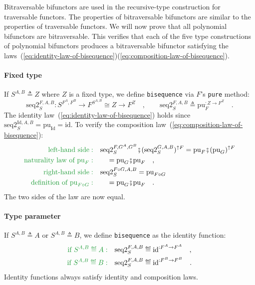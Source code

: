 Bitraversable bifunctors are used in the recursive-type construction
for traversable functors. The properties of bitraversable bifunctors
are similar to the properties of traversable functors. We will now
prove that all polynomial bifunctors are bitraversable. This verifies
that each of the five type constructions of polynomial bifunctors
produces a bitraversable bifunctor satisfying the laws~(\ref{eq:identity-law-of-bisequence})\textendash (\ref{eq:composition-law-of-bisequence}).

\paragraph{Fixed type}

If $S^{A,B}\triangleq Z$ where $Z$ is a fixed type, we define \lstinline!bisequence!
via $F$\textsf{'}s \lstinline!pure! method:
\[
\text{seq2}_{S}^{F,A,B}:S^{F^{A},F^{B}}\rightarrow F^{S^{A,B}}\cong Z\rightarrow F^{Z}\quad,\quad\quad\text{seq2}_{S}^{F,A,B}\triangleq\text{pu}_{F}^{:Z\rightarrow F^{Z}}\quad.
\]
The identity law~(\ref{eq:identity-law-of-bisequence}) holds since
$\text{seq2}_{S}^{\text{Id},A,B}=\text{pu}_{\text{Id}}=\text{id}$.
To verify the composition law~(\ref{eq:composition-law-of-bisequence}):
\begin{align*}
{\color{greenunder}\text{left-hand side}:}\quad & \text{seq2}_{S}^{F,G^{A},G^{B}}\bef(\text{seq2}_{S}^{G,A,B})^{\uparrow F}=\text{pu}_{F}\bef(\text{pu}_{G})^{\uparrow F}\\
{\color{greenunder}\text{naturality law of }\text{pu}_{F}:}\quad & \quad=\text{pu}_{G}\bef\text{pu}_{F}\quad,\\
{\color{greenunder}\text{right-hand side}:}\quad & \text{seq2}_{S}^{F\circ G,A,B}=\text{pu}_{F\circ G}\\
{\color{greenunder}\text{definition of }\text{pu}_{F\circ G}:}\quad & \quad=\text{pu}_{G}\bef\text{pu}_{F}\quad.
\end{align*}
The two sides of the law are now equal.

\paragraph{Type parameter}

If $S^{A,B}\triangleq A$ or $S^{A,B}\triangleq B$, we define \lstinline!bisequence!
as the identity function:
\begin{align*}
{\color{greenunder}\text{if }S^{A,B}\triangleq A:}\quad & \text{seq2}_{S}^{F,A,B}\triangleq\text{id}^{:F^{A}\rightarrow F^{A}}\quad,\\
{\color{greenunder}\text{if }S^{A,B}\triangleq B:}\quad & \text{seq2}_{S}^{F,A,B}\triangleq\text{id}^{:F^{B}\rightarrow F^{B}}\quad.
\end{align*}
Identity functions always satisfy identity and composition laws.

